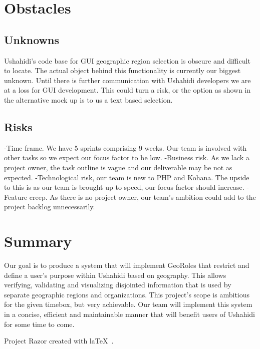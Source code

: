 \documentclass{article}
\begin{document}
\section{Obstacles}
\subsection{Unknowns}
Ushahidi's code base for GUI geographic region selection is obscure and difficult to locate. The actual object behind this functionality is currently our biggest unknown. Until there is further communication with Ushahidi developers we are at a loss for GUI development. This could turn a risk, or the option as shown in the alternative mock up is to us a text based selection.
\subsection{Risks}
-Time frame. We have 5 sprints comprising 9 weeks. Our team is involved with other tasks so we expect our focus factor to be low.
-Business risk. As we lack a project owner, the task outline is vague and our deliverable may be not as expected.
-Technological risk, our team is new to PHP and Kohana. The upside to this is as our team is brought up to speed, our focus factor should increase.
-Feature creep. As there is no project owner, our team's ambition could add to the project backlog unnecessarily.

\section{Summary}
Our goal is to produce a system that will implement GeoRoles that restrict and define a user's purpose within Ushahidi based on geography. This allows verifying, validating and visualizing disjointed information that is used by separate geographic regions and organizations. This project's scope is ambitious for the given timebox, but very achievable. Our team will implement this system in a concise, efficient and maintainable manner that will benefit users of Ushahidi for some time to come. 
\vfill
\begin{center}
Project Razor created with la\TeX~.
\end{center}
\end{document}
